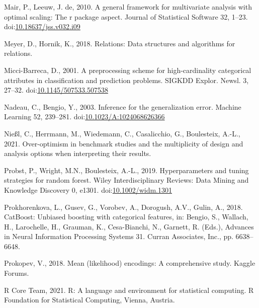 \documentclass[smallextended]{svjour3}       %
\newlength{\cslhangindent}
\newlength{\cslentryspacingunit} %
\newenvironment{CSLReferences}[2] %
 {%
  \setlength{\parindent}{0pt}
  \ifodd #1
  \let\oldpar\par
  \def\par{\hangindent=\cslhangindent\oldpar}
  \fi
  \setlength{\parskip}{#2\cslentryspacingunit}
 }%
 {}
\begin{document}
\begin{CSLReferences}{1}{0}
\leavevmode{}%
Mair, P., Leeuw, J. de, 2010. A general framework for multivariate analysis with optimal scaling: The r package aspect. Journal of Statistical Software 32, 1--23. doi:\href{https://doi.org/10.18637/jss.v032.i09}{10.18637/jss.v032.i09}

\leavevmode{}%
Meyer, D., Hornik, K., 2018. Relations: Data structures and algorithms for relations.

\leavevmode{}%
Micci-Barreca, D., 2001. A preprocessing scheme for high-cardinality categorical attributes in classification and prediction problems. SIGKDD Explor. Newsl. 3, 27--32. doi:\href{https://doi.org/10.1145/507533.507538}{10.1145/507533.507538}

\leavevmode{}%
Nadeau, C., Bengio, Y., 2003. Inference for the generalization error. Machine Learning 52, 239--281. doi:\href{https://doi.org/10.1023/A:1024068626366}{10.1023/A:1024068626366}

\leavevmode{}%
Nie{\ss}l, C., Herrmann, M., Wiedemann, C., Casalicchio, G., Boulesteix, A.-L., 2021. Over-optimism in benchmark studies and the multiplicity of design and analysis options when interpreting their results.

\leavevmode{}%
Probst, P., Wright, M.N., Boulesteix, A.-L., 2019. Hyperparameters and tuning strategies for random forest. Wiley Interdisciplinary Reviews: Data Mining and Knowledge Discovery 0, e1301. doi:\href{https://doi.org/10.1002/widm.1301}{10.1002/widm.1301}

\leavevmode{}%
Prokhorenkova, L., Gusev, G., Vorobev, A., Dorogush, A.V., Gulin, A., 2018. CatBoost: Unbiased boosting with categorical features, in: Bengio, S., Wallach, H., Larochelle, H., Grauman, K., Cesa-Bianchi, N., Garnett, R. (Eds.), Advances in Neural Information Processing Systems 31. Curran Associates, Inc., pp. 6638--6648.

\leavevmode{}%
Prokopev, V., 2018. Mean (likelihood) encodings: A comprehensive study. Kaggle Forums.

\leavevmode{}%
R Core Team, 2021. R: A language and environment for statistical computing. R Foundation for Statistical Computing, Vienna, Austria.


\end{CSLReferences}
\end{document}
